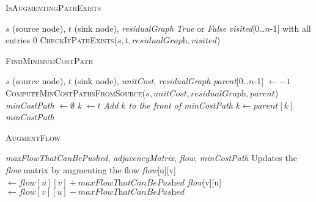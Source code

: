 \documentclass{article}
\begin{document}
\begin{algorithm}[H]
\caption{\textcolor{keywordcolor}{\textsc{IsAugmentingPathExists}}}
\begin{algorithmic}[1]
\State {} $s$ (source node), $t$ (sink node), \textit{residualGraph}
\State {} \textit{True} or \textit{False}
\State {} \textit{visited}[0…$n$-1] with all entries 0
\State \Return \textcolor{identifiercolor}{\textsc{CheckIfPathExists}}($s, t, \textit{residualGraph}, \textit{visited}$)
\end{algorithmic}
\end{algorithm}

\begin{algorithm}[H]
\caption{\textcolor{keywordcolor}{\textsc{FindMinimumCostPath}}}
\begin{algorithmic}[1]
\State {} $s$ (source node), $t$ (sink node), \textit{unitCost}, \textit{residualGraph}
\State {} \textit{parent}[0…$n$-1] $\gets -1$
\State \textcolor{identifiercolor}{\textsc{ComputeMinCostPathsFromSource}}($s, \textit{unitCost}, \textit{residualGraph}, \textit{parent}$)
\State {} \textit{minCostPath} $\gets \emptyset$
\State \textit{k} $\gets t$
    \State \textit{Add $k$ to the front of minCostPath}
    \State $k \gets \textit{parent}[k]$
\EndWhile
\State \Return \textit{minCostPath}
\end{algorithmic}
\end{algorithm}


\begin{algorithm}[H]
\caption{\textcolor{keywordcolor}{\textsc{AugmentFlow}}}
\begin{algorithmic}[1]
\State {} \textit{maxFlowThatCanBePushed}, \textit{adjacencyMatrix}, \textit{flow}, \textit{minCostPath}
\State {} Updates the \textit{flow} matrix by augmenting the flow
        \State \textit{flow}[u][v] $\gets \textit{flow}[u][v] + \textit{maxFlowThatCanBePushed}$
        \State \textit{flow}[v][u] $\gets \textit{flow}[v][u] - \textit{maxFlowThatCanBePushed}$
    \EndIf
\EndFor
\end{algorithmic}
\end{algorithm}
\end{document}
